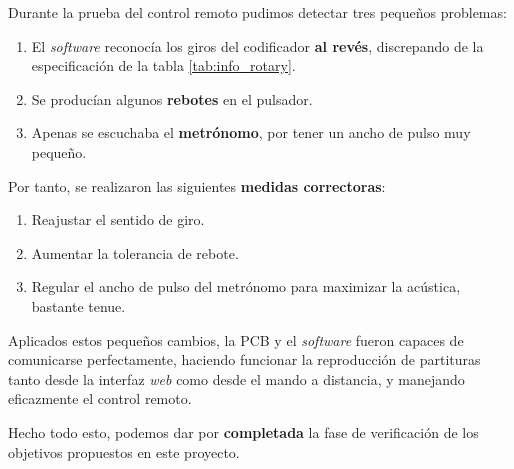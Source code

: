 Durante la prueba del control remoto pudimos detectar tres pequeños problemas:

\begin{enumerate}
	\item El \textit{software} reconocía los giros del codificador \textbf{al revés}, discrepando de la especificación de la tabla \ref{tab:info_rotary}.
	\item Se producían algunos \textbf{rebotes} en el pulsador.
	\item Apenas se escuchaba el \textbf{metrónomo}, por tener un ancho de pulso muy pequeño.
\end{enumerate}

Por tanto, se realizaron las siguientes \textbf{medidas correctoras}:

\begin{enumerate}
	\item Reajustar el sentido de giro.
	\item Aumentar la tolerancia de rebote.
	\item Regular el ancho de pulso del metrónomo para maximizar la acústica, bastante tenue.
\end{enumerate}

Aplicados estos pequeños cambios, la \acrshort{PCB} y el \textit{software} fueron capaces de comunicarse perfectamente, haciendo funcionar la reproducción de partituras tanto desde la interfaz \textit{web} como desde el mando a distancia, y manejando eficazmente el control remoto. 

Hecho todo esto, podemos dar por \textbf{completada} la fase de verificación de los objetivos propuestos en este proyecto.

\newpage
\clearpage{\pagestyle{empty}\cleardoublepage}

